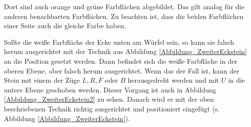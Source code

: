 \documentclass[12pt,a4paper, usenames, dvipsnames]{article}
\theoremstyle{mystyle}
\theoremstyle{definition}
\begin{document}
Dort sind auch orange und grüne Farbflächen abgebildet. Das gilt analog für die anderen benachbarten Farbflächen. Zu beachten ist, dass die beiden Farbflächen einer Seite auch die gleiche Farbe haben.

Sollte die weiße Farbfläche der Ecke unten am Würfel sein, so kann sie falsch herum ausgerichtet mit der Technik aus Abbildung \ref{Abbildung_ZweiterEckstein} an die Position gesetzt werden. Dann befindet sich die weiße Farbfläche in der oberen Ebene, aber falsch herum ausgerichtet. Wenn das der Fall ist, kann der Stein mit einem der Züge $L, R, F$ oder $B$ herausgedreht werden und mit $U$ in die untere Ebene geschoben werden. Dieser Vorgang ist auch in Abbildung \ref{Abbildung_ZweiterEckstein2} zu sehen. Danach wird er mit der oben beschriebenen Technik richtig ausgerichtet und positioniert eingefügt (s. Abbildung \ref{Abbildung_ZweiterEckstein}). 
\end{document}
